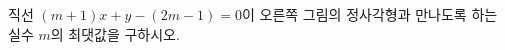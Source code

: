 \noindent\begin{minipage}[t]{0.58\linewidth}\vspace{0pt}\raggedright 직선 $(m+1)x+y-(2m-1)=0$이 오른쪽 그림의 정사각형과 만나도록 하는 실수 $m$의 최댓값을 구하시오.\end{minipage}\hfill\begin{minipage}[t]{0.4\linewidth}\vspace{0pt}\centering \resizebox{\ifdim\width>\linewidth\linewidth\else\width\fi}{!}{}\end{minipage}\par
